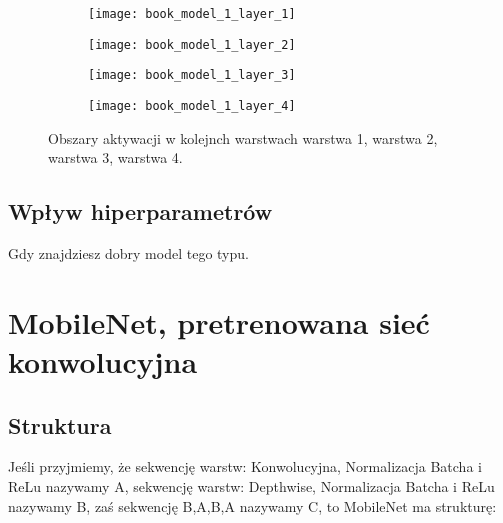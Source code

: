 \begin{figure}[h]
	\centering
	\begin{subfigure}{0.4\textwidth}
		\centering
		\texttt{[image: book\_model\_1\_layer\_1]}
		\subcaption{\label{subfigure_a}}
	\end{subfigure}
	\begin{subfigure}{0.4\textwidth}
		\centering
		\texttt{[image: book\_model\_1\_layer\_2]}
		\subcaption{\label{subfigure_b}}
	\end{subfigure}
	\begin{subfigure}{0.4\textwidth}
		\centering
		\texttt{[image: book\_model\_1\_layer\_3]}
		\subcaption{\label{subfigure_c}}
	\end{subfigure}
	\begin{subfigure}{0.4\textwidth}
		\centering
		\texttt{[image: book\_model\_1\_layer\_4]}
		\subcaption{\label{subfigure_d}}
	\end{subfigure}
	
	\caption{\label{fig:subcaption_example}Obszary aktywacji w kolejnch warstwach \protect{} warstwa 1, \protect{} warstwa 2, \protect{} warstwa 3, \protect{} warstwa 4.}
\end{figure}

\subsection{Wpływ hiperparametrów}
Gdy znajdziesz dobry model tego typu.

\section{MobileNet, pretrenowana sieć konwolucyjna}
\subsection{Struktura}

Jeśli przyjmiemy, że sekwencję warstw: Konwolucyjna, Normalizacja Batcha i ReLu nazywamy A, sekwencję warstw: Depthwise, Normalizacja Batcha i ReLu nazywamy B, zaś sekwencję B,A,B,A nazywamy C, to MobileNet ma strukturę:

